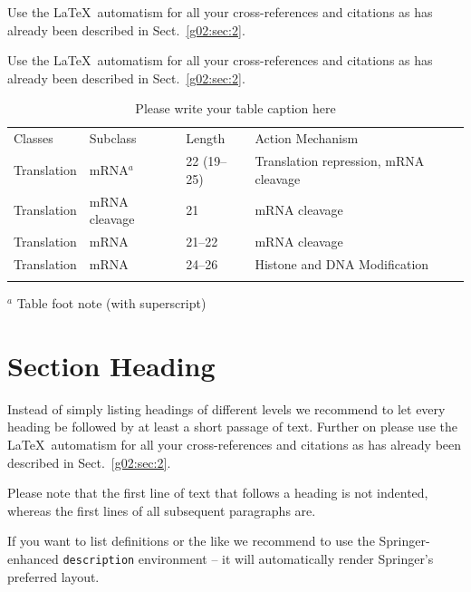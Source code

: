  Use the \LaTeX\ automatism for all your cross-references and citations as has already been described in Sect.~\ref{g02:sec:2}.

 Use the \LaTeX\ automatism for all your cross-refer\-ences and citations as has already been described in Sect.~\ref{g02:sec:2}.
%
%
\begin{table}
\caption{Please write your table caption here}
\label{g02:tab:1}       %
%
%
\begin{tabular}{p{2cm}p{2.4cm}p{2cm}p{4.9cm}}
\hline\noalign{\smallskip}
Classes & Subclass & Length & Action Mechanism  \\
\noalign{\smallskip}\svhline\noalign{\smallskip}
Translation & mRNA$^a$  & 22 (19--25) & Translation repression, mRNA cleavage\\
Translation & mRNA cleavage & 21 & mRNA cleavage\\
Translation & mRNA  & 21--22 & mRNA cleavage\\
Translation & mRNA  & 24--26 & Histone and DNA Modification\\
\noalign{\smallskip}\hline\noalign{\smallskip}
\end{tabular}
$^a$ Table foot note (with superscript)
\end{table}
%
\section{Section Heading}
\label{g02:sec:3}
Instead of simply listing headings of different levels we recommend to let every heading be followed by at least a short passage of text. Further on please use the \LaTeX\ automatism for all your cross-references and citations as has already been described in Sect.~\ref{g02:sec:2}.

Please note that the first line of text that follows a heading is not indented, whereas the first lines of all subsequent paragraphs are.

If you want to list definitions or the like we recommend to use the Springer-enhanced \verb|description| environment -- it will automatically render Springer's preferred layout.

